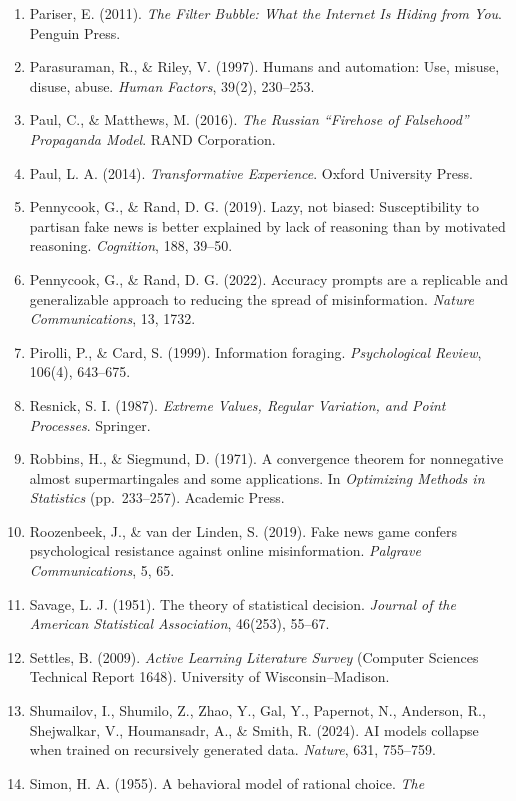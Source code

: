 \documentclass[
  11pt]{article}
\begin{document}
\begin{enumerate}
{  Research}, 24(2), 293--305.
\item
  Pariser, E. (2011). \emph{The Filter Bubble: What the Internet Is
  Hiding from You}. Penguin Press.
\item
  Parasuraman, R., \& Riley, V. (1997). Humans and automation: Use,
  misuse, disuse, abuse. \emph{Human Factors}, 39(2), 230--253.
\item
  Paul, C., \& Matthews, M. (2016). \emph{The Russian ``Firehose of
  Falsehood'' Propaganda Model}. RAND Corporation.
\item
  Paul, L. A. (2014). \emph{Transformative Experience}. Oxford
  University Press.
\item
  Pennycook, G., \& Rand, D. G. (2019). Lazy, not biased: Susceptibility
  to partisan fake news is better explained by lack of reasoning than by
  motivated reasoning. \emph{Cognition}, 188, 39--50.
\item
  Pennycook, G., \& Rand, D. G. (2022). Accuracy prompts are a
  replicable and generalizable approach to reducing the spread of
  misinformation. \emph{Nature Communications}, 13, 1732.
\item
  Pirolli, P., \& Card, S. (1999). Information foraging.
  \emph{Psychological Review}, 106(4), 643--675.
\item
  Resnick, S. I. (1987). \emph{Extreme Values, Regular Variation, and
  Point Processes}. Springer.
\item
  Robbins, H., \& Siegmund, D. (1971). A convergence theorem for
  nonnegative almost supermartingales and some applications. In
  \emph{Optimizing Methods in Statistics} (pp.~233--257). Academic
  Press.
\item
  Roozenbeek, J., \& van der Linden, S. (2019). Fake news game confers
  psychological resistance against online misinformation. \emph{Palgrave
  Communications}, 5, 65.
\item
  Savage, L. J. (1951). The theory of statistical decision.
  \emph{Journal of the American Statistical Association}, 46(253),
  55--67.
\item
  Settles, B. (2009). \emph{Active Learning Literature Survey} (Computer
  Sciences Technical Report 1648). University of Wisconsin--Madison.
\item
  Shumailov, I., Shumilo, Z., Zhao, Y., Gal, Y., Papernot, N., Anderson,
  R., Shejwalkar, V., Houmansadr, A., \& Smith, R. (2024). AI models
  collapse when trained on recursively generated data. \emph{Nature},
  631, 755--759.
\item
  Simon, H. A. (1955). A behavioral model of rational choice. \emph{The
}
\end{enumerate}
\end{document}
